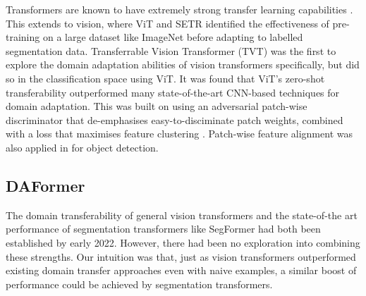 \documentclass[a4paper,12pt]{report}
\begin{document}
Transformers are known to have extremely strong transfer learning capabilities \cite{radford_language_2019} \cite{wright_transformer_2020}. This extends to vision, where ViT \cite{dosovitskiy_image_2021} and SETR \cite{zheng_rethinking_2021} identified the effectiveness of pre-training on a large dataset like ImageNet before adapting to labelled segmentation data. Transferrable Vision Transformer (TVT) \cite{yang_tvt_2021} was the first to explore the domain adaptation abilities of vision transformers specifically, but did so in the classification space using ViT. It was found that ViT's zero-shot transferability outperformed many state-of-the-art CNN-based techniques for domain adaptation. This was built on using an adversarial patch-wise discriminator that de-emphasises easy-to-disciminate patch weights, combined with a loss that maximises feature clustering \cite{chapelle_semi-supervised_2005}. Patch-wise feature alignment was also applied in \cite{wang_exploring_2021} for object detection.

\subsection*{DAFormer}

The domain transferability of general vision transformers and the state-of-the art performance of segmentation transformers like SegFormer \cite{xie_segformer_2021} had both been established by early 2022. However, there had been no exploration into combining these strengths.
Our intuition was that, just as vision transformers outperformed existing domain transfer approaches even with naive examples, a similar boost of performance could be achieved by segmentation transformers.
\end{document}
